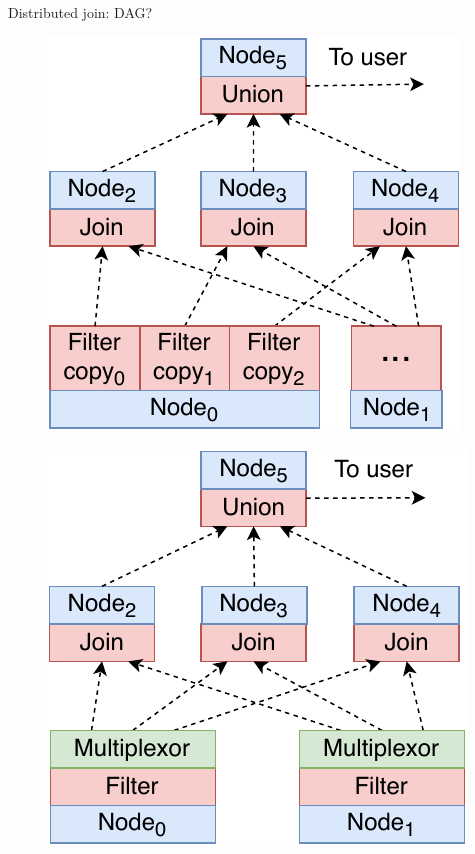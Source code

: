 \documentclass[compress, dvipsnames, unicode]{beamer}
\begin{document}
\begin{frame}{Distributed join: DAG?}
\centering
\begin{figure}
    \begin{minipage}[c]{0.46\textwidth}
        \includegraphics[width=\textwidth]{images/dag_copy.pdf}
        \label{fig:dag:copy}
    \end{minipage}\hfill
    \begin{minipage}[c]{0.46\textwidth}
        \includegraphics[width=\textwidth]{images/dag_multi.pdf}
        \label{fig:dag:multi}
    \end{minipage}
\end{figure}
\end{frame}
\end{document}
